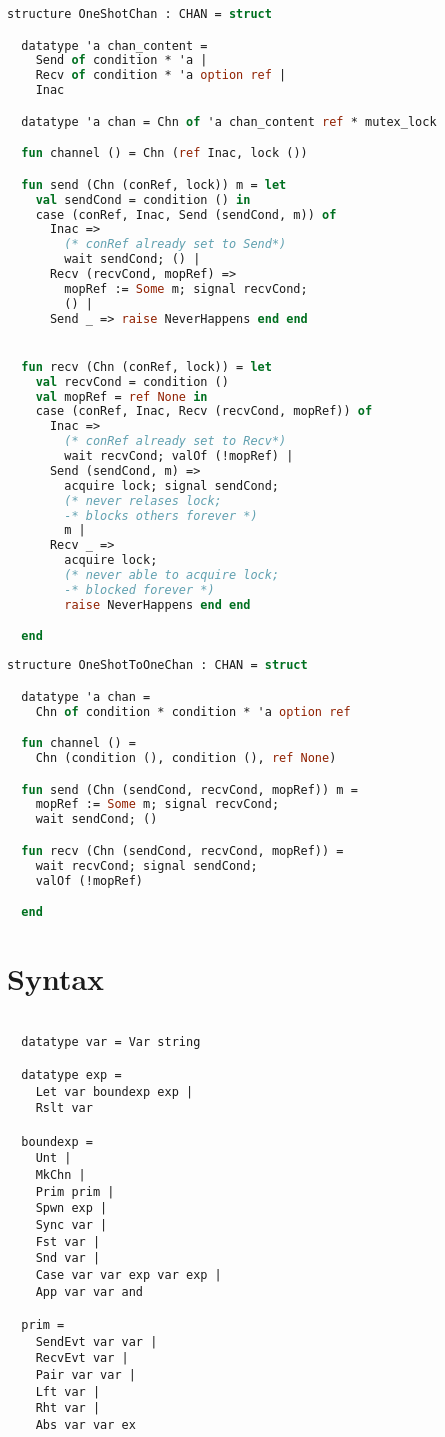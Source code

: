 \documentclass{article}
\begin{document}
\begin{lstlisting}[language=ML, style=codestyle1]
  structure OneShotChan : CHAN = struct

  datatype 'a chan_content =
    Send of condition * 'a |
    Recv of condition * 'a option ref |
    Inac  

  datatype 'a chan = Chn of 'a chan_content ref * mutex_lock

  fun channel () = Chn (ref Inac, lock ())

  fun send (Chn (conRef, lock)) m = let
    val sendCond = condition () in
    case (conRef, Inac, Send (sendCond, m)) of
      Inac =>
        (* conRef already set to Send*)
        wait sendCond; () |
      Recv (recvCond, mopRef) =>
        mopRef := Some m; signal recvCond;
        () |
      Send _ => raise NeverHappens end end


  fun recv (Chn (conRef, lock)) = let
    val recvCond = condition ()
    val mopRef = ref None in
    case (conRef, Inac, Recv (recvCond, mopRef)) of
      Inac =>
        (* conRef already set to Recv*)
        wait recvCond; valOf (!mopRef) |
      Send (sendCond, m) =>
        acquire lock; signal sendCond;
        (* never relases lock;
        -* blocks others forever *)
        m |
      Recv _ =>
        acquire lock;
        (* never able to acquire lock;
        -* blocked forever *)
        raise NeverHappens end end

  end
  \end{lstlisting}

\begin{lstlisting}[language=ML, style=codestyle1]
structure OneShotToOneChan : CHAN = struct

  datatype 'a chan =
    Chn of condition * condition * 'a option ref

  fun channel () =
    Chn (condition (), condition (), ref None)

  fun send (Chn (sendCond, recvCond, mopRef)) m =
    mopRef := Some m; signal recvCond;  
    wait sendCond; ()

  fun recv (Chn (sendCond, recvCond, mopRef)) =
    wait recvCond; signal sendCond;
    valOf (!mopRef)

  end
  \end{lstlisting}


\section{Syntax}

\begin{lstlisting}[style=codestyle1]

  datatype var = Var string

  datatype exp = 
    Let var boundexp exp |
    Rslt var

  boundexp =
    Unt |
    MkChn |
    Prim prim |
    Spwn exp |
    Sync var |
    Fst var |
    Snd var |
    Case var var exp var exp |
    App var var and

  prim = 
    SendEvt var var |
    RecvEvt var |
    Pair var var |
    Lft var |
    Rht var |
    Abs var var ex

\end{lstlisting}
\end{document}
